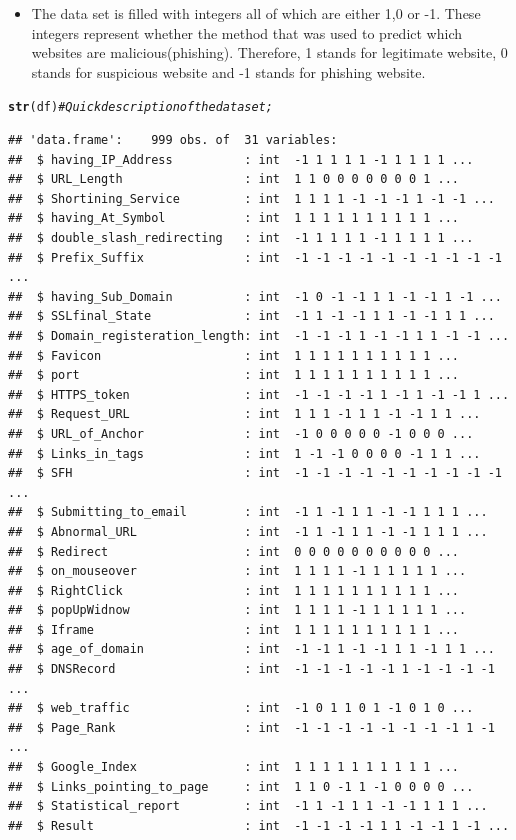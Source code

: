 \documentclass{article}\usepackage[]{graphicx}\usepackage[]{color}
\makeatletter
\newcommand{\hlcom}[1]{\textcolor[rgb]{0.678,0.584,0.686}{\textit{#1}}}%
\newcommand{\hlstd}[1]{\textcolor[rgb]{0.345,0.345,0.345}{#1}}%
\newcommand{\hlkwd}[1]{\textcolor[rgb]{0.737,0.353,0.396}{\textbf{#1}}}%
\newenvironment{kframe}{%
 \def\at@end@of@kframe{}%
 \ifinner\ifhmode%
  \def\at@end@of@kframe{\end{minipage}}%
  \begin{minipage}{\columnwidth}%
 \fi\fi%
 \def\FrameCommand##1{\hskip\@totalleftmargin \hskip-\fboxsep
 \colorbox{shadecolor}{##1}\hskip-\fboxsep
     \hskip-\linewidth \hskip-\@totalleftmargin \hskip\columnwidth}%
 \MakeFramed {\advance\hsize-\width
   \@totalleftmargin\z@ \linewidth\hsize
   \@setminipage}}%
 {\par\unskip\endMakeFramed%
 \at@end@of@kframe}
\newenvironment{knitrout}{}{} %
\makeatother
\begin{document}
\begin{itemize}
\item 
\newline The data set is filled with integers all of which are either 1,0 or -1. These integers represent whether the method that was used to predict which websites are malicious(phishing). Therefore,
1 stands for legitimate website, 0 stands for suspicious website and -1 stands for phishing website.
\end{itemize}

\begin{knitrout}
\color{fgcolor}\begin{kframe}
\begin{alltt}
\hlkwd{str}\hlstd{(df)} \hlcom{# Quick description of the dataset;}
\end{alltt}
\begin{verbatim}
## 'data.frame':	999 obs. of  31 variables:
##  $ having_IP_Address          : int  -1 1 1 1 1 -1 1 1 1 1 ...
##  $ URL_Length                 : int  1 1 0 0 0 0 0 0 0 1 ...
##  $ Shortining_Service         : int  1 1 1 1 -1 -1 -1 1 -1 -1 ...
##  $ having_At_Symbol           : int  1 1 1 1 1 1 1 1 1 1 ...
##  $ double_slash_redirecting   : int  -1 1 1 1 1 -1 1 1 1 1 ...
##  $ Prefix_Suffix              : int  -1 -1 -1 -1 -1 -1 -1 -1 -1 -1 ...
##  $ having_Sub_Domain          : int  -1 0 -1 -1 1 1 -1 -1 1 -1 ...
##  $ SSLfinal_State             : int  -1 1 -1 -1 1 1 -1 -1 1 1 ...
##  $ Domain_registeration_length: int  -1 -1 -1 1 -1 -1 1 1 -1 -1 ...
##  $ Favicon                    : int  1 1 1 1 1 1 1 1 1 1 ...
##  $ port                       : int  1 1 1 1 1 1 1 1 1 1 ...
##  $ HTTPS_token                : int  -1 -1 -1 -1 1 -1 1 -1 -1 1 ...
##  $ Request_URL                : int  1 1 1 -1 1 1 -1 -1 1 1 ...
##  $ URL_of_Anchor              : int  -1 0 0 0 0 0 -1 0 0 0 ...
##  $ Links_in_tags              : int  1 -1 -1 0 0 0 0 -1 1 1 ...
##  $ SFH                        : int  -1 -1 -1 -1 -1 -1 -1 -1 -1 -1 ...
##  $ Submitting_to_email        : int  -1 1 -1 1 1 -1 -1 1 1 1 ...
##  $ Abnormal_URL               : int  -1 1 -1 1 1 -1 -1 1 1 1 ...
##  $ Redirect                   : int  0 0 0 0 0 0 0 0 0 0 ...
##  $ on_mouseover               : int  1 1 1 1 -1 1 1 1 1 1 ...
##  $ RightClick                 : int  1 1 1 1 1 1 1 1 1 1 ...
##  $ popUpWidnow                : int  1 1 1 1 -1 1 1 1 1 1 ...
##  $ Iframe                     : int  1 1 1 1 1 1 1 1 1 1 ...
##  $ age_of_domain              : int  -1 -1 1 -1 -1 1 1 -1 1 1 ...
##  $ DNSRecord                  : int  -1 -1 -1 -1 -1 1 -1 -1 -1 -1 ...
##  $ web_traffic                : int  -1 0 1 1 0 1 -1 0 1 0 ...
##  $ Page_Rank                  : int  -1 -1 -1 -1 -1 -1 -1 -1 1 -1 ...
##  $ Google_Index               : int  1 1 1 1 1 1 1 1 1 1 ...
##  $ Links_pointing_to_page     : int  1 1 0 -1 1 -1 0 0 0 0 ...
##  $ Statistical_report         : int  -1 1 -1 1 1 -1 -1 1 1 1 ...
##  $ Result                     : int  -1 -1 -1 -1 1 1 -1 -1 1 -1 ...
\end{verbatim}
\end{kframe}
\end{knitrout}
\end{document}
